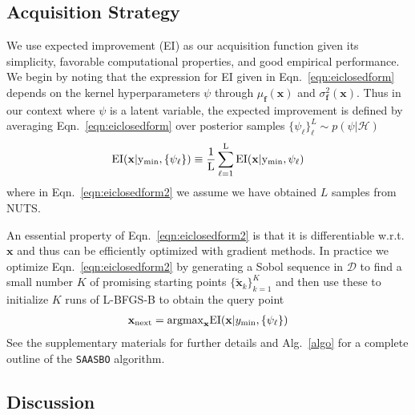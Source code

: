 \documentclass[accepted]{uai2021} %
\newcommand{\algoname}{{\texttt {SAASBO}}}
\newcommand{\bff}{\mathbf{f}}
\newcommand{\bx}{\mathbf{x}}
\newcommand{\DD}{\mathcal{D}}
\begin{document}
\subsection{Acquisition Strategy}
\label{sec:acquisitionstrat}
We use expected improvement (EI) as our acquisition function given its simplicity,
favorable computational properties, and good empirical performance.
We begin by noting that the expression for EI given
in Eqn.~\eqref{eqn:eiclosedform} depends on the kernel hyperparameters $\psi$ through $\mu_\bff(\bx)$ and $\sigma_\bff^2(\bx)$.
Thus in our context where $\psi$ is a latent variable, the expected improvement is defined by averaging Eqn.~\eqref{eqn:eiclosedform}
over posterior samples $\{ \psi_\ell \}_{\ell}^L \sim p(\psi | \mathcal{H}) $
\begin{align}
\label{eqn:eiclosedform2}
\rm{EI}(\bx |  y_{\rm min}, \{ \psi_\ell \}) \equiv \frac{1}{L} \sum_{\ell=1}^L \rm{EI}(\bx |  y_{\rm min}, \psi_\ell)
\end{align}
where in Eqn.~\eqref{eqn:eiclosedform2} we assume we have obtained $L$ samples from NUTS.

An essential property of Eqn.~\eqref{eqn:eiclosedform2} is that it is differentiable w.r.t.~$\bx$ and thus
can be efficiently optimized with gradient methods.
In practice we optimize Eqn.~\eqref{eqn:eiclosedform2} by generating a Sobol sequence in $\DD$ to find a small
number $K$ of promising starting points $\{\tilde{\bx}_k \}_{k=1}^K$ and then use these to initialize $K$ runs
of L-BFGS-B to obtain the query point
\begin{align}
\bx_{\rm next} = {\rm argmax}_\bx {\rm EI}(\bx |  y_{\rm min}, \{ \psi_\ell \})
\end{align}
See the supplementary materials for further details and Alg.~\ref{algo} for a complete outline of the \algoname{} algorithm.

\subsection{Discussion}
\label{sec:methoddisc}
\end{document}

